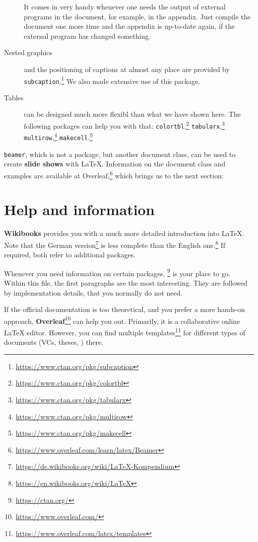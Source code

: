 \begin{description}
		It comes in very handy whenever one needs the output of external programs in the document, for example, in the appendix.
		Just compile the document one more time and the appendix is up-to-date again, if the external program has changed something.
	\item[Nested graphics]
		and the positioning of captions at almost any place are provided by  
		\texttt{subcaption}.\footnote{\url{https://www.ctan.org/pkg/subcaption}}
		We also made extensive use of this package.
	\item[Tables]
		can be designed much more flexibl than what we have shown here. 
		The following packages can help you with that:
		\texttt{colortbl},\footnote{\url{https://www.ctan.org/pkg/colortbl}}
		\texttt{tabularx},\footnote{\url{https://www.ctan.org/pkg/tabularx}}
		\texttt{multirow},\footnote{\url{https://www.ctan.org/pkg/multirow}}
		\texttt{makecell}.\footnote{\url{https://www.ctan.org/pkg/makecell}}
\end{description}

\noindent \texttt{beamer}, which is not a package, but another document class, can be used to create \textbf{slide shows}
with \LaTeX{}. Information on the document class and examples are available at Overleaf,\footnote{\url{https://www.overleaf.com/learn/latex/Beamer}} which brings us to the next section:

\section{Help and information}

\textbf{Wikibooks} provides you with a much more detailed introduction into \LaTeX{}. Note that the German version\footnote{\url{https://de.wikibooks.org/wiki/LaTeX-Kompendium}} is less complete than the English one.\footnote{\url{https://en.wikibooks.org/wiki/LaTeX}}
If required, both refer to additional packages.

Whenever you need information on certain packages, \footnote{\url{https://ctan.org/}} is your place to go. 
Within this file, the first paragraphs are the most interesting. They are 
followed by implementation details, that you normally do not need.

If the official documentation is too theoretical, and you prefer a more hands-on approach, \textbf{Overleaf}\footnote{\url{https://www.overleaf.com/}} can help you out.
Primarily, it is a collaborative online \LaTeX{} editor. However, you can find multiple templates\footnote{\url{https://www.overleaf.com/latex/templates}} for different types of documents (VCs, theses, \textellipsis) there.

